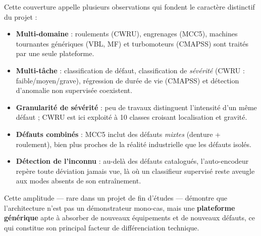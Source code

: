 Cette couverture appelle plusieurs observations qui fondent le caractère distinctif du
projet :
\begin{itemize}[leftmargin=1.5em]
  \item \textbf{Multi-domaine} : roulements (CWRU), engrenages (MCC5), machines tournantes
        génériques (VBL, MF) et turbomoteurs (CMAPSS) sont traités par une seule plateforme.
  \item \textbf{Multi-tâche} : classification de défaut, classification de \emph{sévérité}
        (CWRU : faible/moyen/grave), régression de durée de vie (CMAPSS) et détection
        d'anomalie non supervisée coexistent.
  \item \textbf{Granularité de sévérité} : peu de travaux distinguent l'intensité d'un
        même défaut ; CWRU est ici exploité à 10 classes croisant localisation et gravité.
  \item \textbf{Défauts combinés} : MCC5 inclut des défauts \emph{mixtes} (denture +
        roulement), bien plus proches de la réalité industrielle que les défauts isolés.
  \item \textbf{Détection de l'inconnu} : au-delà des défauts catalogués, l'auto-encodeur
        repère toute déviation jamais vue, là où un classifieur supervisé reste aveugle aux
        modes absents de son entraînement.
\end{itemize}
Cette amplitude --- rare dans un projet de fin d'études --- démontre que l'architecture
n'est pas un démonstrateur mono-cas, mais une \textbf{plateforme générique} apte à
absorber de nouveaux équipements et de nouveaux défauts, ce qui constitue son principal
facteur de différenciation technique.
